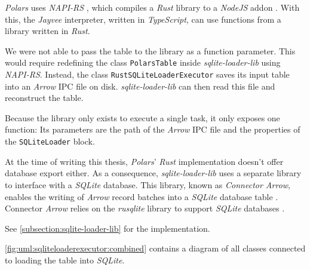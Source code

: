 \emph{Polars} uses \emph{NAPI-RS} \autocite{polars:src:napi}, which compiles a \emph{Rust} library to a \emph{NodeJS} addon \autocite{napi}.
With this, the \emph{Jayvee} interpreter, written in \emph{TypeScript}, can use functions from a library written in \emph{Rust}.

We were not able to pass the table to the library as a function parameter.
This would require redefining the class \Verb|PolarsTable| inside \emph{sqlite-loader-lib} using \emph{NAPI-RS}.
Instead, the class \Verb|RustSQLiteLoaderExecutor| saves its input table into an \emph{Arrow} \ac{IPC} file on disk.
\emph{sqlite-loader-lib} can then read this file and reconstruct the table.


Because the library only exists to execute a single task, it only exposes one function:
Its parameters are the path of the \emph{Arrow} \ac{IPC} file and the properties of the \Verb|SQLiteLoader| block.

At the time of writing this thesis, \emph{Polars}' \emph{Rust} implementation doesn't offer database export either.
As a consequence, \emph{sqlite-loader-lib} uses a separate library to interface with a \emph{SQLite} database.
This library, known as \emph{Connector Arrow}, enables the writing of \emph{Arrow} record batches into a \emph{SQLite} database table \autocite{connector-arrow}.
Connector \emph{Arrow} relies on the \emph{rusqlite} library to support \emph{SQLite} databases \autocite{connector-arrow}.

See \autoref{subsection:sqlite-loader-lib} for the implementation.

\autoref{fig:uml:sqliteloaderexecutor:combined} contains a diagram of all classes connected to loading the table into \emph{SQLite}.

